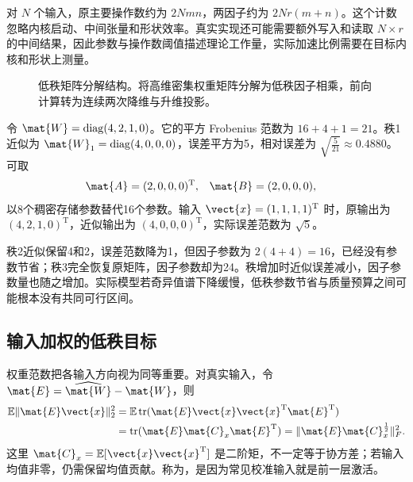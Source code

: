 \documentclass[../textbook.tex]{subfiles}
\begin{document}
对 $N$ 个输入，原主要操作数约为 $2Nmn$，两因子约为 $2Nr(m+n)$。这个计数忽略内核启动、中间张量和形状效率。真实实现还可能需要额外写入和读取 $N\times r$ 的中间结果，因此参数与操作数阈值描述理论工作量，实际加速比例需要在目标内核和形状上测量。

\begin{figure}[htbp]
\centering
{}
\caption[低秩矩阵分解结构]{低秩矩阵分解结构。将高维密集权重矩阵分解为低秩因子相乘，前向计算转为连续两次降维与升维投影。}\label{fig:compress-lowrank}
\end{figure}

\begin{example}


令 $\mat{W}=\operatorname{diag}(4,2,1,0)$。它的平方 Frobenius 范数为 $16+4+1=21$。秩1近似为 $\mat{W}_1=\operatorname{diag}(4,0,0,0)$，误差平方为5，相对误差为 $\sqrt{\frac{5}{21}}\approx0.4880$。可取
\begin{align*}
 \mat{A} &= (2,0,0,0)^{\mathrm{T}}, & \mat{B} &= (2,0,0,0),
\end{align*}
以8个稠密存储参数替代16个参数。输入 $\vect{x}=(1,1,1,1)^{\mathrm{T}}$ 时，原输出为 $(4,2,1,0)^{\mathrm{T}}$，近似输出为 $(4,0,0,0)^{\mathrm{T}}$，实际误差范数为 $\sqrt5$。

秩2近似保留4和2，误差范数降为1，但因子参数为 $2(4+4)=16$，已经没有参数节省；秩3完全恢复原矩阵，因子参数却为24。秩增加时近似误差减小，因子参数量也随之增加。实际模型若奇异值谱下降缓慢，低秩参数节省与质量预算之间可能根本没有共同可行区间。
\end{example}

\subsection{输入加权的低秩目标}
\optional
权重范数把各输入方向视为同等重要。对真实输入，令 $\mat{E}=\widehat{\mat{W}}-\mat{W}$，则
\begin{align}
 \mathbb E\|\mat{E}\vect{x}\|_2^2
 &=\mathbb E\operatorname{tr}(\mat{E}\vect{x}\vect{x}^{\mathrm{T}}\mat{E}^{\mathrm{T}})\\
 &=\operatorname{tr}(\mat{E}\mat{C}_x\mat{E}^{\mathrm{T}})
 =\|\mat{E}\mat{C}_x^{\frac{1}{2}}\|_F^2.
 \label{eq:compress-weighted}
\end{align}
这里 $\mat{C}_x=\mathbb E[\vect{x}\vect{x}^{\mathrm{T}}]$ 是二阶矩，不一定等于协方差；若输入均值非零，仍需保留均值贡献。称为，是因为常见校准输入就是前一层激活。
\end{document}
